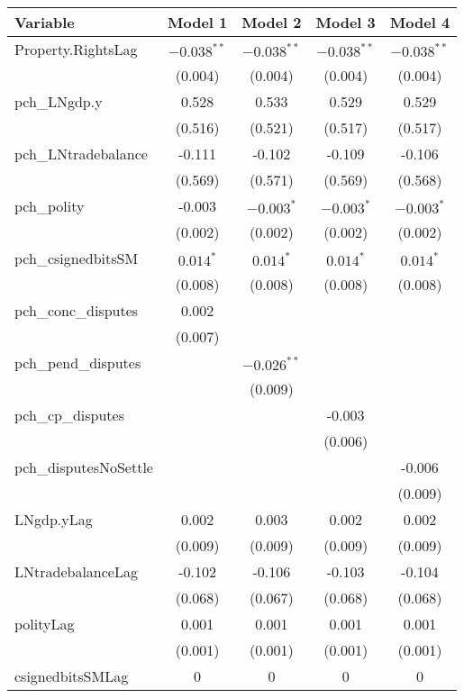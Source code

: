 \begin{table}[ht]
\centering
\begin{tabular}{lcccc}
 Variable & Model 1 & Model 2 & Model 3 & Model 4 \\ 
  \hline
\hline
Property.RightsLag & $-0.038^{\ast\ast}$ & $-0.038^{\ast\ast}$ & $-0.038^{\ast\ast}$ & $-0.038^{\ast\ast}$ \\ 
   & (0.004) & (0.004) & (0.004) & (0.004) \\ 
   \hline
pch\_LNgdp.y & 0.528 & 0.533 & 0.529 & 0.529 \\ 
   & (0.516) & (0.521) & (0.517) & (0.517) \\ 
  pch\_LNtradebalance & -0.111 & -0.102 & -0.109 & -0.106 \\ 
   & (0.569) & (0.571) & (0.569) & (0.568) \\ 
  pch\_polity & -0.003 & $-0.003^{\ast}$ & $-0.003^{\ast}$ & $-0.003^{\ast}$ \\ 
   & (0.002) & (0.002) & (0.002) & (0.002) \\ 
  pch\_csignedbitsSM & $0.014^{\ast}$ & $0.014^{\ast}$ & $0.014^{\ast}$ & $0.014^{\ast}$ \\ 
   & (0.008) & (0.008) & (0.008) & (0.008) \\ 
  pch\_conc\_disputes & 0.002 &  &  &  \\ 
   & (0.007) &  &  &  \\ 
  pch\_pend\_disputes &  & $-0.026^{\ast\ast}$ &  &  \\ 
   &  & (0.009) &  &  \\ 
  pch\_cp\_disputes &  &  & -0.003 &  \\ 
   &  &  & (0.006) &  \\ 
  pch\_disputesNoSettle &  &  &  & -0.006 \\ 
   &  &  &  & (0.009) \\ 
   \hline
LNgdp.yLag & 0.002 & 0.003 & 0.002 & 0.002 \\ 
   & (0.009) & (0.009) & (0.009) & (0.009) \\ 
  LNtradebalanceLag & -0.102 & -0.106 & -0.103 & -0.104 \\ 
   & (0.068) & (0.067) & (0.068) & (0.068) \\ 
  polityLag & 0.001 & 0.001 & 0.001 & 0.001 \\ 
   & (0.001) & (0.001) & (0.001) & (0.001) \\ 
  csignedbitsSMLag & 0 & 0 & 0 & 0 \\ 

\end{tabular}
\end{table}
